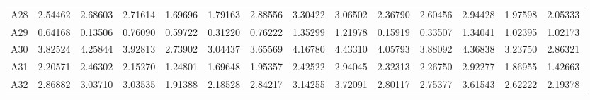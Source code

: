 \begin{tabular}{cccccccccccccc}
     A28   &  2.54462 &  2.68603 &  2.71614 &  1.69696 &  1.79163 &  2.88556 &  3.30422 &  3.06502 &  2.36790 &  2.60456 &  2.94428 &  1.97598 &  2.05333\\ 
     A29   &  0.64168 &  0.13506 &  0.76090 &  0.59722 &  0.31220 &  0.76222 &  1.35299 &  1.21978 &  0.15919 &  0.33507 &  1.34041 &  1.02395 &  1.02173\\ 
     A30   &  3.82524 &  4.25844 &  3.92813 &  2.73902 &  3.04437 &  3.65569 &  4.16780 &  4.43310 &  4.05793 &  3.88092 &  4.36838 &  3.23750 &  2.86321\\ 
     A31   &  2.20571 &  2.46302 &  2.15270 &  1.24801 &  1.69648 &  1.95357 &  2.42522 &  2.94045 &  2.32313 &  2.26750 &  2.92277 &  1.86955 &  1.42663\\ 
     A32   &  2.86882 &  3.03710 &  3.03535 &  1.91388 &  2.18528 &  2.84217 &  3.14255 &  3.72091 &  2.80117 &  2.75377 &  3.61543 &  2.62222 &  2.19378\\ 
    \bottomrule
    \end{tabular}